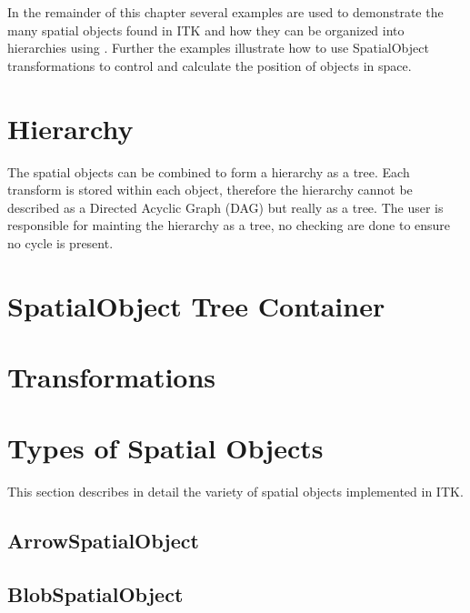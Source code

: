 In the remainder of this chapter several examples are used to demonstrate
the many spatial objects found in ITK and how they can be organized into
hierarchies using . Further the examples
illustrate how to use SpatialObject transformations to control and 
calculate the position of objects in space.

\section{Hierarchy}

The spatial objects can be combined to form a hierarchy as a tree.
Each transform is stored within each object, therefore the hierarchy cannot
be described as a Directed Acyclic Graph (DAG) but really as a tree.
The user is responsible for mainting the hierarchy as a tree, no checking are done
to ensure no cycle is present.

\label{sec:SpatialObjectHierarchy}
\ifitkFullVersion 

\fi

\section{SpatialObject Tree Container}
\label{sec:SpatialObjectTreeContainer}
\ifitkFullVersion 

\fi

\section{Transformations}
\label{sec:SpatialObjectTransforms}
\ifitkFullVersion 

\fi

\section{Types of Spatial Objects}
\label{sec:Principal Objects}

This section describes in detail the variety of spatial objects 
implemented in ITK. 

\subsection{ArrowSpatialObject}
\label{sec:ArrowSpatialObject}
\ifitkFullVersion 

\fi

\subsection{BlobSpatialObject}
\label{sec:BlobSpatialObject}
\ifitkFullVersion 

\fi

